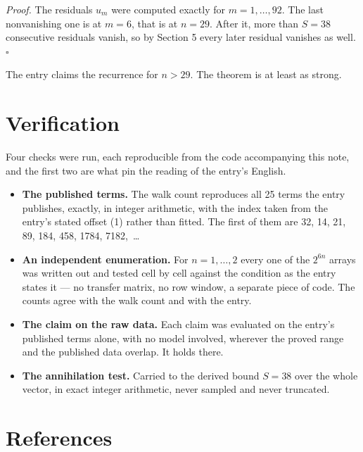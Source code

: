 \documentclass[11pt]{article}
\theoremstyle{definition}
\begin{document}
{\itshape Proof.} The residuals $u_m$ were computed exactly for $m = 1,\dots,92$. The last nonvanishing one is at $m = 6$, that is at $n = 29$. After it, more than $S = 38$ consecutive residuals vanish, so by Section 5 every later residual vanishes as well. $\square$

The entry claims the recurrence for $n > 29$. The theorem is at least as strong.

\section{Verification}

Four checks were run, each reproducible from the code accompanying this note, and the first two are what pin the reading of the entry's English.

\begin{itemize}

\item {\bfseries The published terms.} The walk count reproduces all 25 terms the entry publishes, exactly, in integer arithmetic, with the index taken from the entry's stated offset (1) rather than fitted. The first of them are 32, 14, 21, 89, 184, 458, 1784, 7182,~\dots

\item {\bfseries An independent enumeration.} For $n = 1,\dots,2$ every one of the $2^{6n}$ arrays was written out and tested cell by cell against the condition as the entry states it --- no transfer matrix, no row window, a separate piece of code. The counts agree with the walk count and with the entry.

\item {\bfseries The claim on the raw data.} Each claim was evaluated on the entry's published terms alone, with no model involved, wherever the proved range and the published data overlap. It holds there.

\item {\bfseries The annihilation test.} Carried to the derived bound $S = 38$ over the whole vector, in exact integer arithmetic, never sampled and never truncated.

\end{itemize}

\section{References}
\end{document}
